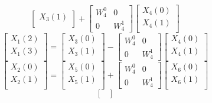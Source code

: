 \documentclass[journal,12pt,twocolumn]{IEEEtran}
\renewcommand\thesection{\arabic{section}}
\begin{document}
\begin{enumerate}[label=\thesection.\arabic*.,ref=\thesection.\theenumi]
\begin{equation}
\begin{bmatrix}
X_{3}(1)\\ 
\end{bmatrix}
+
\begin{bmatrix}
	W^{0}_{4} & 0\\
	0 & W^{1}_{4}
\end{bmatrix}
\begin{bmatrix}
X_{4}(0) \\ 
X_{4}(1) \\ 
\end{bmatrix}
\label{eq:4-1-high}
\end{equation}
\begin{equation}
\begin{bmatrix}
X_{1}(2) \\ 
X_{1}(3)\\ 
\end{bmatrix}
=
\begin{bmatrix}
X_{3}(0) \\ 
X_{3}(1)\\ 
\end{bmatrix}
-
\begin{bmatrix}
W^{0}_{4} & 0\\
0 & W^{1}_{4}
\end{bmatrix}
\begin{bmatrix}
X_{4}(0) \\ 
X_{4}(1) \\ 
\end{bmatrix}
\label{eq:4-1-low}
\end{equation}
\begin{equation}
\begin{bmatrix}
X_{2}(0) \\ 
X_{2}(1)\\ 
\end{bmatrix}
=
\begin{bmatrix}
X_{5}(0) \\ 
X_{5}(1)\\ 
\end{bmatrix}
+
\begin{bmatrix}
W^{0}_{4} & 0\\
0 & W^{1}_{4}
\end{bmatrix}
\begin{bmatrix}
X_{6}(0) \\ 
X_{6}(1) \\ 
\end{bmatrix}
\label{eq:4-2-high}
\end{equation}
\begin{equation}
	\begin{bmatrix}

\end{bmatrix}
\end{equation}
\end{enumerate}
\end{document}
